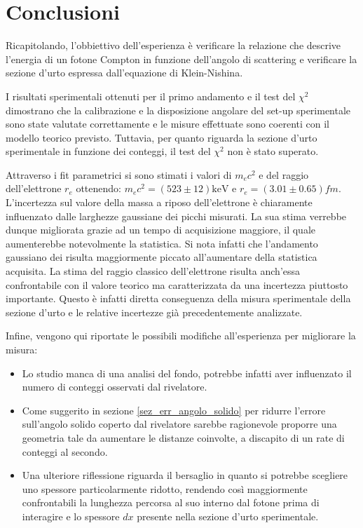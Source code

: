 \section{Conclusioni}
Ricapitolando, l'obbiettivo dell'esperienza è verificare la relazione che descrive l'energia di un fotone Compton in funzione dell'angolo di scattering e verificare la sezione d'urto espressa dall'equazione di Klein-Nishina. 

I risultati sperimentali ottenuti per il primo andamento e il test del $\chi^2$ dimostrano che la calibrazione e la disposizione angolare del set-up sperimentale sono state valutate correttamente e le misure effettuate sono coerenti con il modello teorico previsto. Tuttavia, per quanto riguarda la sezione d'urto sperimentale in funzione dei conteggi, il test del $\chi^2$ non è stato superato. 

Attraverso i fit parametrici si sono stimati i valori di $m_ec^2$ e del raggio dell'elettrone $r_e$ ottenendo: $m_ec^2=(523\pm12)\unit{\kilo\electronvolt}$ e $r_e=(3.01\pm0.65)\unit{fm}$. L'incertezza sul valore della massa a riposo dell'elettrone è chiaramente influenzato dalle larghezze gaussiane dei picchi misurati. La sua stima verrebbe dunque migliorata grazie ad un tempo di acquisizione maggiore, il quale aumenterebbe notevolmente la statistica. Si nota infatti che l'andamento gaussiano dei risulta maggiormente piccato all'aumentare della statistica acquisita.
La stima del raggio classico dell'elettrone risulta anch'essa confrontabile con il valore teorico ma caratterizzata da una incertezza piuttosto importante. Questo è infatti diretta conseguenza della misura sperimentale della sezione d'urto e le relative incertezze già precedentemente analizzate.

\vspace{0.5cm}
Infine, vengono qui riportate le possibili modifiche all'esperienza per migliorare la misura:
\begin{itemize}
    \item Lo studio manca di una analisi del fondo, potrebbe infatti aver influenzato il numero di conteggi osservati dal rivelatore.
    \item Come suggerito in sezione \ref{sez_err_angolo_solido} per ridurre l'errore sull'angolo solido coperto dal rivelatore sarebbe ragionevole proporre una geometria tale da aumentare le distanze coinvolte, a discapito di un rate di conteggi al secondo.
    \item Una ulteriore riflessione riguarda il bersaglio in quanto si potrebbe scegliere uno spessore particolarmente ridotto, rendendo così maggiormente confrontabili la lunghezza percorsa al suo interno dal fotone prima di interagire e lo spessore $dx$ presente nella sezione d'urto sperimentale.
\end{itemize}
